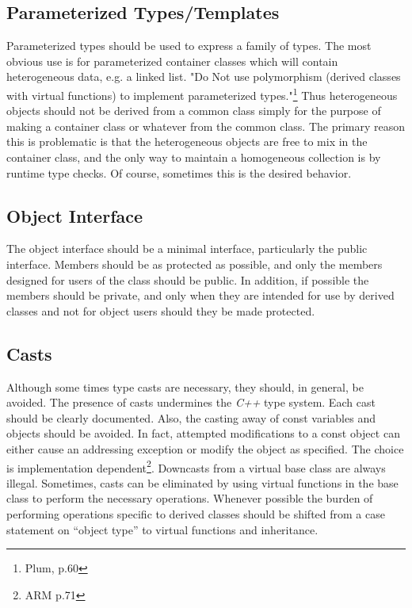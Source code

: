 \subsection{Parameterized Types/Templates}
Parameterized types should be used to express a family of types. The most 
obvious use is for parameterized container classes which will contain
heterogeneous data, e.g. a linked list. "Do Not use polymorphism 
(derived classes with virtual functions) to implement parameterized 
types."\footnote{Plum, p.60} Thus heterogeneous objects should not be
derived from a common class simply for the purpose of making a container
class or whatever from the common class. The primary reason this is 
problematic is that the heterogeneous objects are free to mix in 
the container class, and the only way to maintain a homogeneous collection
is by runtime type checks. Of course, sometimes this is the desired behavior.

\subsection{Object Interface}
The object interface should be a minimal interface, particularly the public
interface. Members should be as protected as possible, and only the
members designed for users of the class should be public. In addition,
if possible the members should be private, and only when they are intended
for use by derived classes and not for object users should they be made 
protected.

\subsection{Casts}
Although some times type casts are necessary, they should, in general, be
avoided. The presence of casts undermines the \emph{C++} type system. Each
cast should be clearly documented. Also, the casting away of const variables
and objects should be avoided. In fact, attempted modifications to
a const object can either cause an addressing exception or modify the object
as specified. The choice is implementation dependent\footnote{ARM p.71}.
Downcasts from a virtual base class are always illegal. Sometimes, casts can
be eliminated by using virtual functions in the base class to perform the
necessary operations. Whenever possible the burden of performing operations
specific to derived classes should be shifted from a case statement on
``object type'' to virtual functions and inheritance.

